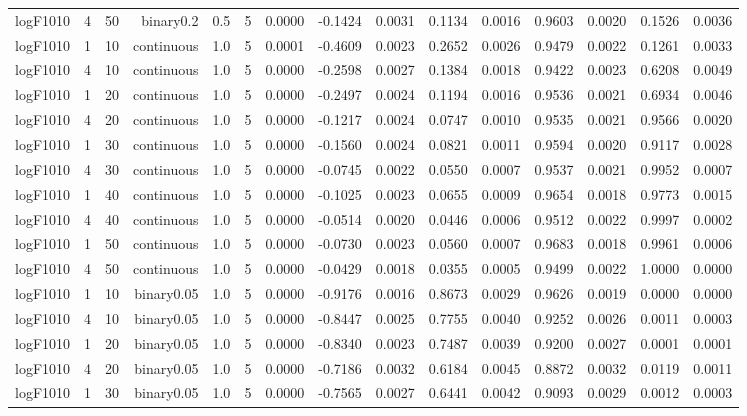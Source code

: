 \begin{longtable}{rrrrrrrrrrrrrrr}
  logF1010 & 4 & 50 & binary0.2 & 0.5 & 5 & 0.0000 & -0.1424 & 0.0031 & 0.1134 & 0.0016 & 0.9603 & 0.0020 & 0.1526 & 0.0036 \\ 
  logF1010 & 1 & 10 & continuous & 1.0 & 5 & 0.0001 & -0.4609 & 0.0023 & 0.2652 & 0.0026 & 0.9479 & 0.0022 & 0.1261 & 0.0033 \\ 
  logF1010 & 4 & 10 & continuous & 1.0 & 5 & 0.0000 & -0.2598 & 0.0027 & 0.1384 & 0.0018 & 0.9422 & 0.0023 & 0.6208 & 0.0049 \\ 
  logF1010 & 1 & 20 & continuous & 1.0 & 5 & 0.0000 & -0.2497 & 0.0024 & 0.1194 & 0.0016 & 0.9536 & 0.0021 & 0.6934 & 0.0046 \\ 
  logF1010 & 4 & 20 & continuous & 1.0 & 5 & 0.0000 & -0.1217 & 0.0024 & 0.0747 & 0.0010 & 0.9535 & 0.0021 & 0.9566 & 0.0020 \\ 
  logF1010 & 1 & 30 & continuous & 1.0 & 5 & 0.0000 & -0.1560 & 0.0024 & 0.0821 & 0.0011 & 0.9594 & 0.0020 & 0.9117 & 0.0028 \\ 
  logF1010 & 4 & 30 & continuous & 1.0 & 5 & 0.0000 & -0.0745 & 0.0022 & 0.0550 & 0.0007 & 0.9537 & 0.0021 & 0.9952 & 0.0007 \\ 
  logF1010 & 1 & 40 & continuous & 1.0 & 5 & 0.0000 & -0.1025 & 0.0023 & 0.0655 & 0.0009 & 0.9654 & 0.0018 & 0.9773 & 0.0015 \\ 
  logF1010 & 4 & 40 & continuous & 1.0 & 5 & 0.0000 & -0.0514 & 0.0020 & 0.0446 & 0.0006 & 0.9512 & 0.0022 & 0.9997 & 0.0002 \\ 
  logF1010 & 1 & 50 & continuous & 1.0 & 5 & 0.0000 & -0.0730 & 0.0023 & 0.0560 & 0.0007 & 0.9683 & 0.0018 & 0.9961 & 0.0006 \\ 
  logF1010 & 4 & 50 & continuous & 1.0 & 5 & 0.0000 & -0.0429 & 0.0018 & 0.0355 & 0.0005 & 0.9499 & 0.0022 & 1.0000 & 0.0000 \\ 
  logF1010 & 1 & 10 & binary0.05 & 1.0 & 5 & 0.0000 & -0.9176 & 0.0016 & 0.8673 & 0.0029 & 0.9626 & 0.0019 & 0.0000 & 0.0000 \\ 
  logF1010 & 4 & 10 & binary0.05 & 1.0 & 5 & 0.0000 & -0.8447 & 0.0025 & 0.7755 & 0.0040 & 0.9252 & 0.0026 & 0.0011 & 0.0003 \\ 
  logF1010 & 1 & 20 & binary0.05 & 1.0 & 5 & 0.0000 & -0.8340 & 0.0023 & 0.7487 & 0.0039 & 0.9200 & 0.0027 & 0.0001 & 0.0001 \\ 
  logF1010 & 4 & 20 & binary0.05 & 1.0 & 5 & 0.0000 & -0.7186 & 0.0032 & 0.6184 & 0.0045 & 0.8872 & 0.0032 & 0.0119 & 0.0011 \\ 
  logF1010 & 1 & 30 & binary0.05 & 1.0 & 5 & 0.0000 & -0.7565 & 0.0027 & 0.6441 & 0.0042 & 0.9093 & 0.0029 & 0.0012 & 0.0003 \\ 

\end{longtable}
